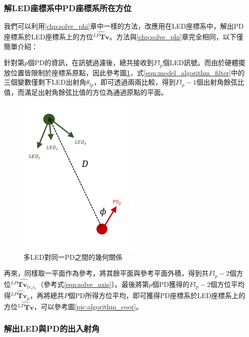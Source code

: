         \subsubsection{解LED座標系中PD座標系所在方位}
        \label{chp:solve_theta}

        我們可以利用\ref{chp:solve_phi}章中一樣的方法，改應用在LED座標系中，解出PD座標系於LED座標系上的方位$\hat{{^{LP}\boldsymbol{Tv}}}$。方法與\ref{chp:solve_phi}章完全相同，以下僅簡單介紹：

        針對第$p$個PD的資訊，在訊號過濾後，總共接收到$Fl_p$個LED訊號。而由於硬體擺放位置皆限制於座標系原點，因此參考圖\ref{pic:mulled_1pd}，式\ref{eqn:model_algorithm_filter}中的三個變數僅剩下LED出射角$\theta_{lp}$，即可透過兩兩比較，得到$Fl_p-1$個出射角餘弦比值，而滿足出射角餘弦比值的方位為通過原點的平面。
        
        \begin{figure}[h!]
            \centering
            \includegraphics[width=6cm]{ch3pic/mulled_1pd.png}
            \caption{多LED對同一PD之間的幾何關係}
            \label{pic:mulled_1pd}
        \end{figure}

        再來，同樣取一平面作為參考，將其餘平面與參考平面外積，得到共$Fl_p-2$個方位$\hat{{^{LP}\boldsymbol{Tv}_{lr_sr_c}}}$（參考式\ref{eqn:solve_axis}）。最後將第$p$個PD獲得的$Fl_p-2$個方位平均得$\hat{{^{LP}\boldsymbol{Tv}_{p}}}$，再將總共$P$個PD所得方位平均，即可獲得PD座標系於LED座標系上的方位$\hat{{^{LP}\boldsymbol{Tv}}}$，可以參考圖\ref{pic:algorithm_coor}。


        \subsubsection{解出LED與PD的出入射角}
        \label{chp:solve_ang}

